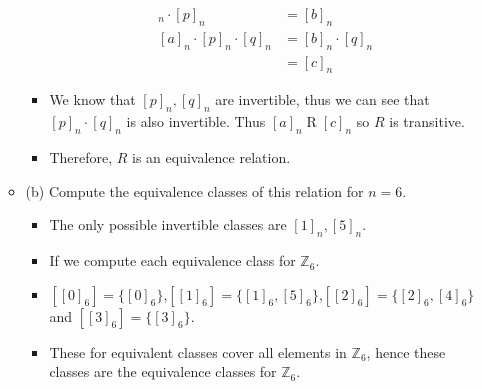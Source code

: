 \documentclass[letterpaper,12pt]{article}
\begin{document}
\begin{enumerate}
\begin{itemize}
\begin{itemize}
\begin{align}
	[a]_n \cdot [p]_n &= [b]_n \\ [a]_n \cdot [p]_n \cdot [q]_n &= [b]_n \cdot [q]_n \\ &= [c]_n	
	\end{align}
	\item We know that $[p]_n,[q]_n$ are invertible, thus we can see that $[p]_n \cdot [q]_n $ is also invertible. Thus $[a]_n \mathrel R [c]_n$ so $R$ is transitive.
	\item Therefore, $R$ is an equivalence relation.
\end{itemize}
\item (b) Compute the equivalence classes of this relation for $n=6$.
\begin{itemize}
\item The only possible invertible classes are $[1]_n,[5]_n$.
\item If we compute each equivalence class for $\mathbb{Z}_6$.
\item $[[0]_6] = \{[0]_6\}$,$ [[1]_6] = \{[1]_6,[5]_6\}$,$[[2]_6]=\{[2]_6,[4]_6\}$ and $[[3]_6] = \{[3]_6\}.$
\item These for equivalent classes cover all elements in $\mathbb{Z}_6$, hence these classes are the equivalence classes for $\mathbb{Z}_6$.
\end{itemize}
\end{itemize}

\end{enumerate}



\end{document}
